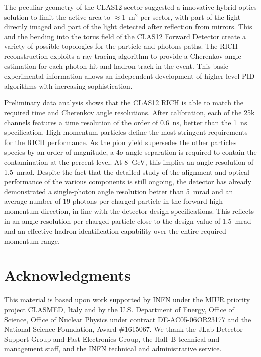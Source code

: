 \documentclass[5p,times,twocolumn]{elsarticle}
\begin{document}
The peculiar geometry of the CLAS12 sector suggested a innovative 
hybrid-optics solution to limit the active area to $\approx$1~m$^2$ per sector, with part of the light directly
imaged and part of the light detected after reflection from mirrors. This and the bending into
the torus field of the CLAS12 Forward Detector create a variety of
possible topologies for the particle and photons paths. 
The RICH reconstruction exploits a ray-tracing algorithm to provide a
Cherenkov angle estimation for each photon hit and hadron track in 
the event. This basic experimental information allows an independent 
development of higher-level PID algorithms with increasing sophistication.

Preliminary data analysis shows that the CLAS12 RICH is able to match the 
required time and Cherenkov angle resolutions. After calibration, each
of the 25k channels features a time resolution of the order of 0.6~ns,
better than the 1~ns specification. High momentum particles
define the most stringent requirements for the RICH performance. As the pion yield
supersedes the other particles species by an order of magnitude, a 
$4\sigma$ angle separation is required to contain the contamination 
at the percent level. At 8~GeV, this implies an angle resolution of 1.5~mrad.
Despite the fact that the detailed study of the alignment and optical performance of the various 
components is still ongoing, the detector has already demonstrated a single-photon 
angle resolution better than 5~mrad and an average number of 19 photons per charged particle
in the forward high-momentum direction, in line with the detector design specifications. This reflects in an angle resolution 
per charged particle close to the design value of 1.5~mrad and an effective hadron identification 
capability over the entire required momentum range.

\section{Acknowledgments}

This material is based upon work supported by INFN under the MIUR priority project CLASMED, Italy and by the
U.S. Department of Energy, Office of Science, Office of Nuclear Physics under contract DE-AC05-06OR23177 and
the National Science Foundation, Award \#1615067. We thank the JLab Detector Support Group and Fast Electronics
Group, the Hall~B technical and management staff, and the INFN technical and administrative service.
\end{document}
